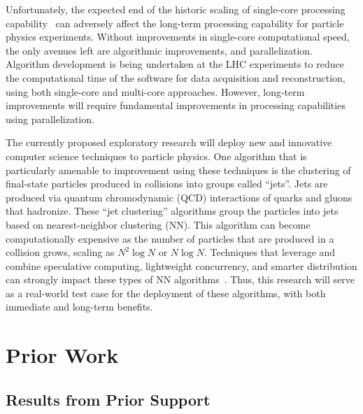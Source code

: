 \documentclass[times,11pt]{article}
\begin{document}
Unfortunately, the expected end of the historic scaling of single-core
processing capability~\cite{GAMEOVER} can adversely affect the
long-term processing capability for particle physics
experiments. Without improvements in single-core computational speed,
the only avenues left are algorithmic improvements, and
parallelization. Algorithm development is being undertaken at the LHC
experiments to
reduce the computational time of the software for data acquisition and
reconstruction, using both single-core and multi-core
approaches. However, long-term improvements will require fundamental
improvements in processing capabilities using parallelization. 

The currently proposed exploratory research will deploy new and
innovative computer science techniques to particle physics. 
One algorithm that is particularly amenable to improvement using these
techniques is the clustering of
final-state particles produced in collisions into groups called
``jets''. Jets are produced via quantum chromodynamic (QCD)
interactions of quarks and gluons that hadronize. 
These ``jet clustering'' algorithms group the particles into jets
based on nearest-neighbor clustering (NN). 
This algorithm can become computationally expensive as the number
of particles that are produced in a collision grows, scaling as
$N^2\log{N}$ or $N\log{N}$. Techniques that leverage and combine speculative computing,
lightweight concurrency, and smarter distribution can strongly impact
these types of NN algorithms~\cite{knn_gpu_1,knn_gpu_2,knn_gpu_3,knn-mapreduce-0,knn-mapreduce-1}. 
Thus, this research will serve as a real-world test case
for the deployment of these algorithms, with both immediate and
long-term benefits. 




 
\section{Prior Work}


\subsection{Results from Prior Support}
\end{document}
